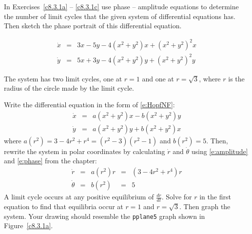 \documentclass{ximera}
\begin{document}
\noindent In Exercises~\ref{c8.3.1a} -- \ref{c8.3.1c} use phase -- amplitude 
equations to determine the number of limit cycles that the given system of 
differential equations has.   Then sketch the phase portrait of this 
differential equation.
\begin{exercise} \label{c8.3.1a}
\[
\begin{array}{rcl}
\dot{x} & = &  3x-5y - 4(x^2+y^2)x + (x^2+y^2)^2x\\
\dot{y} & = &  5x+3y - 4(x^2+y^2)y + (x^2+y^2)^2y
\end{array} 
\]

\begin{solution}

\ans The system has two limit cycles, one at $r = 1$ and one at $r =
\sqrt{3}$, where $r$ is the radius of the circle made by the limit cycle.

\soln Write the differential equation in the form of \eqref{e:HopfNF}:
\[ \begin{array}{rcl}
\dot{x} & = & a(x^2 + y^2)x - b(x^2 + y^2)y \\
\dot{y} & = & a(x^2 + y^2)y + b(x^2 + y^2)x \end{array}
\]
where $a(r^2) = 3 - 4r^2 + r^4=(r^2-3)(r^2-1)$ and $b(r^2) = 5$.  Then,
rewrite the system in polar coordinates by calculating $\dot{r}$ and
$\dot{\theta}$ using \eqref{e:amplitude} and \eqref{e:phase} from the
chapter:
\[ \begin{array}{rcccl}
\dot{r} & = & a(r^2)r & = & (3 - 4r^2 + r^4)r \\
\dot{\theta} & = & b(r^2) & = & 5 \end{array}
\]
A limit cycle occurs at any positive equilibrium of $\frac{dr}{dt}$.
Solve for $r$ in the first equation to find that equilibria occur
at $r = 1$ and $r = \sqrt{3}$.  Then graph the system.  Your drawing
should resemble the {\tt pplane5} graph shown in Figure~\ref{c8.3.1a}.

\begin{figure}[htb]
                       \centerline{%
                       }
\end{figure}


\end{solution}
\end{exercise}
\end{document}
